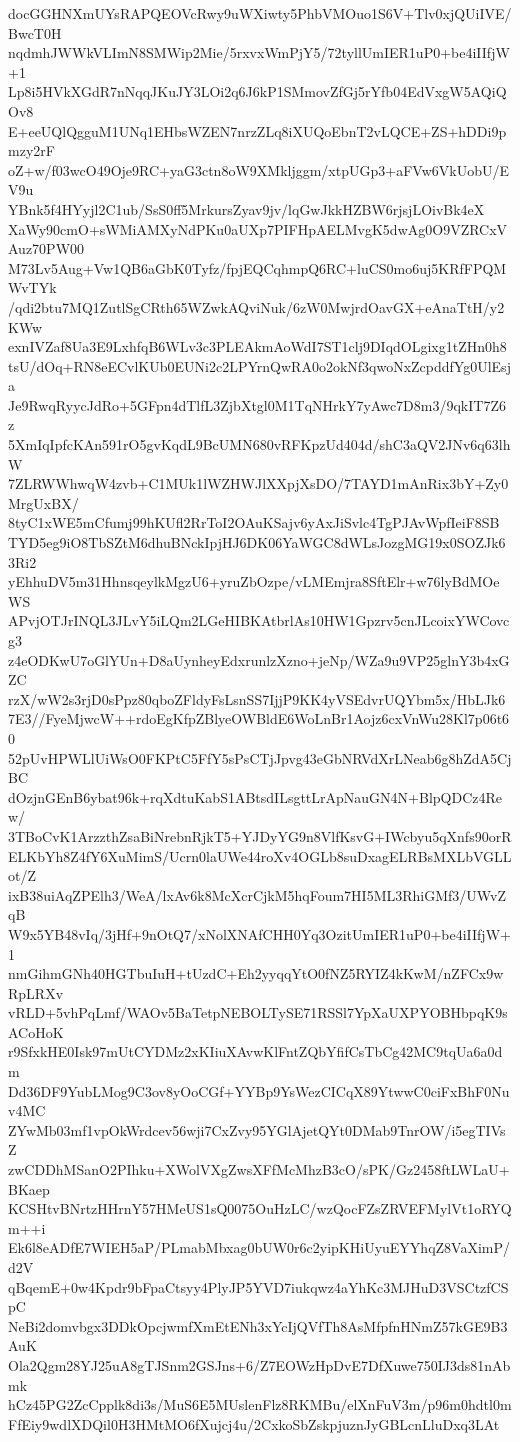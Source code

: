 docGGHNXmUYsRAPQEOVcRwy9uWXiwty5PhbVMOuo1S6V+Tlv0xjQUiIVE/BwcT0H
nqdmhJWWkVLImN8SMWip2Mie/5rxvxWmPjY5/72tyllUmIER1uP0+be4iIIfjW+1
Lp8i5HVkXGdR7nNqqJKuJY3LOi2q6J6kP1SMmovZfGj5rYfb04EdVxgW5AQiQOv8
E+eeUQlQgguM1UNq1EHbsWZEN7nrzZLq8iXUQoEbnT2vLQCE+ZS+hDDi9pmzy2rF
oZ+w/f03wcO49Oje9RC+yaG3ctn8oW9XMkljggm/xtpUGp3+aFVw6VkUobU/EV9u
YBnk5f4HYyjl2C1ub/SsS0ff5MrkursZyav9jv/lqGwJkkHZBW6rjsjLOivBk4eX
XaWy90cmO+sWMiAMXyNdPKu0aUXp7PIFHpAELMvgK5dwAg0O9VZRCxVAuz70PW00
M73Lv5Aug+Vw1QB6aGbK0Tyfz/fpjEQCqhmpQ6RC+luCS0mo6uj5KRfFPQMWvTYk
/qdi2btu7MQ1ZutlSgCRth65WZwkAQviNuk/6zW0MwjrdOavGX+eAnaTtH/y2KWw
exnIVZaf8Ua3E9LxhfqB6WLv3c3PLEAkmAoWdI7ST1clj9DIqdOLgixg1tZHn0h8
tsU/dOq+RN8eECvlKUb0EUNi2c2LPYrnQwRA0o2okNf3qwoNxZcpddfYg0UlEsja
Je9RwqRyycJdRo+5GFpn4dTlfL3ZjbXtgl0M1TqNHrkY7yAwc7D8m3/9qkIT7Z6z
5XmIqIpfcKAn591rO5gvKqdL9BcUMN680vRFKpzUd404d/shC3aQV2JNv6q63lhW
7ZLRWWhwqW4zvb+C1MUk1lWZHWJlXXpjXsDO/7TAYD1mAnRix3bY+Zy0MrgUxBX/
8tyC1xWE5mCfumj99hKUfl2RrToI2OAuKSajv6yAxJiSvlc4TgPJAvWpfIeiF8SB
TYD5eg9iO8TbSZtM6dhuBNckIpjHJ6DK06YaWGC8dWLsJozgMG19x0SOZJk63Ri2
yEhhuDV5m31HhnsqeylkMgzU6+yruZbOzpe/vLMEmjra8SftElr+w76lyBdMOeWS
APvjOTJrINQL3JLvY5iLQm2LGeHIBKAtbrlAs10HW1Gpzrv5cnJLcoixYWCovcg3
z4eODKwU7oGlYUn+D8aUynheyEdxrunlzXzno+jeNp/WZa9u9VP25glnY3b4xGZC
rzX/wW2s3rjD0sPpz80qboZFldyFsLsnSS7IjjP9KK4yVSEdvrUQYbm5x/HbLJk6
7E3//FyeMjwcW++rdoEgKfpZBlyeOWBldE6WoLnBr1Aojz6cxVnWu28Kl7p06t60
52pUvHPWLlUiWsO0FKPtC5FfY5sPsCTjJpvg43eGbNRVdXrLNeab6g8hZdA5CjBC
dOzjnGEnB6ybat96k+rqXdtuKabS1ABtsdILsgttLrApNauGN4N+BlpQDCz4Rew/
3TBoCvK1ArzzthZsaBiNrebnRjkT5+YJDyYG9n8VlfKsvG+IWcbyu5qXnfs90orR
ELKbYh8Z4fY6XuMimS/Ucrn0laUWe44roXv4OGLb8suDxagELRBsMXLbVGLLot/Z
ixB38uiAqZPElh3/WeA/lxAv6k8McXcrCjkM5hqFoum7HI5ML3RhiGMf3/UWvZqB
W9x5YB48vIq/3jHf+9nOtQ7/xNolXNAfCHH0Yq3OzitUmIER1uP0+be4iIIfjW+1
nmGihmGNh40HGTbuIuH+tUzdC+Eh2yyqqYtO0fNZ5RYIZ4kKwM/nZFCx9wRpLRXv
vRLD+5vhPqLmf/WAOv5BaTetpNEBOLTySE71RSSl7YpXaUXPYOBHbpqK9sACoHoK
r9SfxkHE0Isk97mUtCYDMz2xKIiuXAvwKlFntZQbYfifCsTbCg42MC9tqUa6a0dm
Dd36DF9YubLMog9C3ov8yOoCGf+YYBp9YsWezCICqX89YtwwC0ciFxBhF0Nuv4MC
ZYwMb03mf1vpOkWrdcev56wji7CxZvy95YGlAjetQYt0DMab9TnrOW/i5egTIVsZ
zwCDDhMSanO2PIhku+XWolVXgZwsXFfMcMhzB3cO/sPK/Gz2458ftLWLaU+BKaep
KCSHtvBNrtzHHrnY57HMeUS1sQ0075OuHzLC/wzQocFZsZRVEFMylVt1oRYQm++i
Ek6l8eADfE7WIEH5aP/PLmabMbxag0bUW0r6c2yipKHiUyuEYYhqZ8VaXimP/d2V
qBqemE+0w4Kpdr9bFpaCtsyy4PlyJP5YVD7iukqwz4aYhKc3MJHuD3VSCtzfCSpC
NeBi2domvbgx3DDkOpcjwmfXmEtENh3xYcIjQVfTh8AsMfpfnHNmZ57kGE9B3AuK
Ola2Qgm28YJ25uA8gTJSnm2GSJns+6/Z7EOWzHpDvE7DfXuwe750IJ3ds81nAbmk
hCz45PG2ZcCpplk8di3s/MuS6E5MUslenFlz8RKMBu/elXnFuV3m/p96m0hdtl0m
FfEiy9wdlXDQil0H3HMtMO6fXujcj4u/2CxkoSbZskpjuznJyGBLcnLluDxq3LAt
